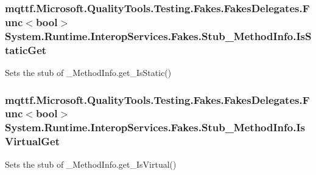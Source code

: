 \hypertarget{class_system_1_1_runtime_1_1_interop_services_1_1_fakes_1_1_stub___method_info_ae31e898b26f3d415d103acbeae1c2522}{
\subsubsection[{Is\-Static\-Get}]{\setlength{\rightskip}{0pt plus 5cm}mqttf.\-Microsoft.\-Quality\-Tools.\-Testing.\-Fakes.\-Fakes\-Delegates.\-Func$<$bool$>$ System.\-Runtime.\-Interop\-Services.\-Fakes.\-Stub\-\_\-\-Method\-Info.\-Is\-Static\-Get}}\label{class_system_1_1_runtime_1_1_interop_services_1_1_fakes_1_1_stub___method_info_ae31e898b26f3d415d103acbeae1c2522}


Sets the stub of \-\_\-\-Method\-Info.\-get\-\_\-\-Is\-Static()

\hypertarget{class_system_1_1_runtime_1_1_interop_services_1_1_fakes_1_1_stub___method_info_a876d4daedcda37cd18fcc18d97cef079}{
\subsubsection[{Is\-Virtual\-Get}]{\setlength{\rightskip}{0pt plus 5cm}mqttf.\-Microsoft.\-Quality\-Tools.\-Testing.\-Fakes.\-Fakes\-Delegates.\-Func$<$bool$>$ System.\-Runtime.\-Interop\-Services.\-Fakes.\-Stub\-\_\-\-Method\-Info.\-Is\-Virtual\-Get}}\label{class_system_1_1_runtime_1_1_interop_services_1_1_fakes_1_1_stub___method_info_a876d4daedcda37cd18fcc18d97cef079}


Sets the stub of \-\_\-\-Method\-Info.\-get\-\_\-\-Is\-Virtual()

